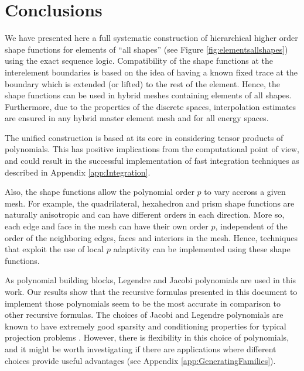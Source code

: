 \section{Conclusions}
\label{sec:Conclusions}

We have presented here a full systematic construction of hierarchical higher order shape functions for elements of ``all shapes'' (see Figure \ref{fig:elementsallshapes}) using the exact sequence logic.
Compatibility of the shape functions at the interelement boundaries is based on the idea of having a known fixed trace at the boundary which is extended (or lifted) to the rest of the element.
Hence, the shape functions can be used in hybrid meshes containing elements of all shapes.
Furthermore, due to the properties of the discrete spaces, interpolation estimates are ensured in any hybrid master element mesh and for all energy spaces.

The unified construction is based at its core in considering tensor products of polynomials.
This has positive implications from the computational point of view, and could result in the successful implementation of fast integration techniques as described in Appendix \ref{app:Integration}.

Also, the shape functions allow the polynomial order $p$ to vary accross a given mesh. 
For example, the quadrilateral, hexahedron and prism shape functions are naturally anisotropic and can have different orders in each direction.
More so, each edge and face in the mesh can have their own order $p$, independent of the order of the neighboring edges, faces and interiors in the mesh.
Hence, techniques that exploit the use of local $p$ adaptivity can be implemented using these shape functions.

As polynomial building blocks, Legendre and Jacobi polynomials are used in this work.
Our results show that the recursive formulas presented in this document to implement those polynomials seem to be the most accurate in comparison to other recursive formulas. 
The choices of Jacobi and Legendre polynomials are known to have extremely good sparsity and conditioning properties for typical projection problems \citep{Beuchler_Pillwein_Schoeberl_Zaglmayr_12}.
However, there is flexibility in this choice of polynomials, and it might be worth investigating if there are applications where different choices provide useful advantages (see Appendix \ref{app:GeneratingFamilies}).

